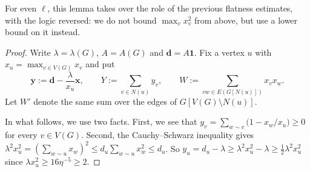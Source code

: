 \documentclass[11pt, a4paper]{article}
\theoremstyle{definition}
\theoremstyle{plain}
\renewcommand{\le}{\leqslant}
\renewcommand{\ge}{\geqslant}
\newcommand{\one}{\mathbf{1}}
\begin{document}
For even $\ell$, this lemma takes over the role of the previous flatness estimates, with the logic reversed: 
we do not bound $\max_v x_v^2$ from above, but use a lower bound on it instead. 

\begin{proof}
Write $\lambda =\lambda (G)$, $A=A(G)$ and
$\bm{d}=A\one$. Fix a vertex $u$ with
$x_u=\max_{v\in V(G)}x_v$ and put 
\[
  \bm{y}:=\bm{d}-\frac{\lambda}{x_u}\bm{x},
  \qquad
  Y:=\sum_{v\in N(u)}y_v,
  \qquad
  W:=\!\!\sum_{vw\in E(G[N(u)]) }\!\!x_vx_w .
\]
Let $W'$ denote the same sum over the edges of
$G[V(G)\setminus N(u)]$. 

In what follows, we use two facts.
First, we see that 
$  y_v=\sum_{w\sim v}\bigl(1- {x_w}/{x_u}\bigr) \ge 0$ 
for every $v\in V(G)$.
Second, the Cauchy--Schwarz inequality gives
$\lambda^2x_u^2=(\sum_{w\sim u}x_w)^2
\le d_u\sum_{w\sim u}x_w^2\le d_u$. So
$y_u=d_u-\lambda \ge \lambda^2x_u^2-\lambda
\ge \frac12\lambda^2x_u^2$ since
$\lambda x_u^2\ge 16\eta^{-5}\ge 2$.


\end{proof}
\end{document}
